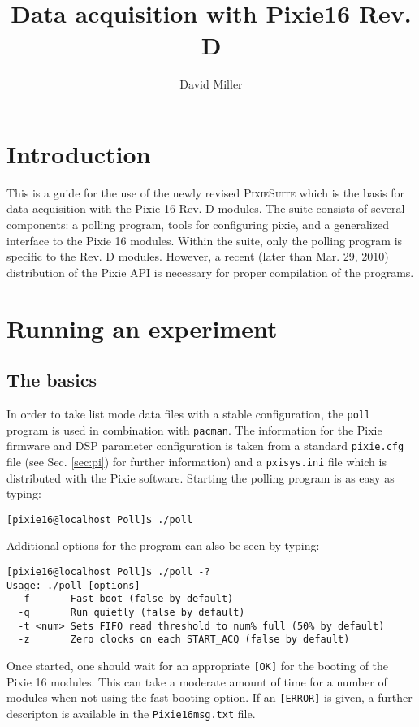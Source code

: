 \documentclass{article}
\title{Data acquisition with Pixie16 Rev. D}
\author{David Miller}
\newcommand{\okay}{\texttt{[OK]}}
\newcommand{\error}{\texttt{[ERROR]}}
\begin{document}
\maketitle
\setcounter{tocdepth}{1}
\setlength{\LTcapwidth}{\textwidth}
\tableofcontents
\section{Introduction}
This is a guide for the use of the newly revised \textsc{PixieSuite} which is the basis for data acquisition with the Pixie 16 Rev. D modules. The suite consists of several components: a polling program, tools for configuring pixie, and a generalized interface to the Pixie 16 modules. Within the suite, only the polling program is specific to the Rev. D modules. However, a recent (later than Mar. 29, 2010) distribution of the Pixie API is necessary for proper compilation of the programs.
\section{Running an experiment}
\subsection{The basics}
In order to take list mode data files with a stable configuration, the \texttt{poll} program is used in combination with \texttt{pacman}. The information for the Pixie firmware and DSP parameter configuration is taken from a standard \texttt{pixie.cfg} file (see Sec. \ref{sec:pi}) for further information) and a \texttt{pxisys.ini} file which is distributed with the Pixie software. Starting the polling program is as easy as typing:
\begin{verbatim}
[pixie16@localhost Poll]$ ./poll
\end{verbatim}
Additional options for the program can also be seen by typing:
\begin{verbatim}
[pixie16@localhost Poll]$ ./poll -?
Usage: ./poll [options]
  -f       Fast boot (false by default)
  -q       Run quietly (false by default)
  -t <num> Sets FIFO read threshold to num% full (50% by default)
  -z       Zero clocks on each START_ACQ (false by default)
\end{verbatim}
Once started, one should wait for an appropriate \okay{} for the booting of the Pixie 16 modules. This can take a moderate amount of time for a number of modules when not using the fast booting option. If an \error{} is given, a further descripton is available in the \texttt{Pixie16msg.txt} file.
\end{document}
